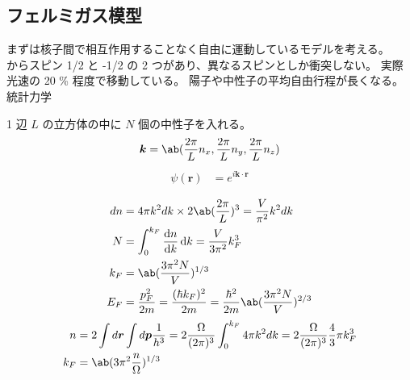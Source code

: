 \documentclass[uplatex,dvipdfmx,a4paper,11pt]{jlreq}
\newcommand{\rr}{\bm{r}}
\newcommand{\kk}{\bm{k}}
\newcommand{\pp}{\bm{p}}
\numberwithin{equation}{section}
\theoremstyle{definition}
\begin{document}
\subsection{フェルミガス模型}
まずは核子間で相互作用することなく自由に運動しているモデルを考える。 \\
からスピン 1/2 と -1/2 の 2 つがあり、異なるスピンとしか衝突しない。
実際光速の 20 \% 程度で移動している。
陽子や中性子の平均自由行程が長くなる。
統計力学



1 辺 $L$ の立方体の中に $N$ 個の中性子を入れる。
\begin{align}
  \bm{k} = \ab(\frac{2\pi}{L}n_x, \frac{2\pi}{L}n_y, \frac{2\pi}{L}n_z)
\end{align}
\begin{align}
  \psi(\rr) & = e^{i\kk\cdot\rr}
\end{align}

\begin{align}
  dn  & = 4\pi k^2dk \times 2 \ab(\frac{2\pi}{L})^3 = \frac{V}{\pi^2}k^2dk                              \\
  N   & = \int_0^{k_F}\diff{n}{k}\dl{k} = \frac{V}{3\pi^2}k_F^3                                         \\
  k_F & = \ab(\frac{3\pi^2 N}{V})^{1/3}                                                                 \\
  E_F & = \frac{p_F^2}{2m} = \frac{(\hbar k_F)^2}{2m} = \frac{\hbar^2}{2m}\ab(\frac{3\pi^2 N}{V})^{2/3}
\end{align}
\begin{align}
  n   & = 2\int d\rr \int d\pp \frac{1}{h^3} = 2\frac{\Omega}{(2\pi)^3}\int_0^{k_F}4\pi k^2dk = 2\frac{\Omega}{(2\pi)^3}\frac{4}{3}\pi k_F^3 \\
  k_F & = \ab(3\pi^2\frac{n}{\Omega})^{1/3}
\end{align}
\end{document}
